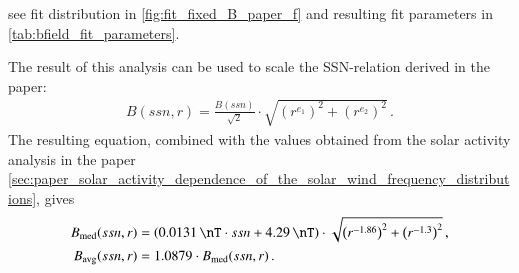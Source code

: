 see fit distribution in \autoref{fig:fit_fixed_B_paper_f} and resulting fit parameters in \autoref{tab:bfield_fit_parameters}.\\
\begin{figure}[htb]
\end{figure}


The result of this analysis can be used to scale the SSN-relation derived in the paper:
\begin{align}
	B(ssn,r) = \frac{B(ssn)}{\sqrt{2}} \cdot \sqrt{\left(r^{e_1}\right)^2 + \left(r^{e_2}\right)^2}	\,.
\end{align}
The resulting equation, combined with the values obtained from the solar activity analysis in the paper \autoref{sec:paper_solar_activity_dependence_of_the_solar_wind_frequency_distributions}, gives
\begin{align}
	B_\text{med}(ssn,r) &= \left(\SI{0.0131}{\nT} \cdot ssn + \SI{4.29}{\nT}\right) \cdot \sqrt{\left(r^{-1.86}\right)^2 + \left(r^{-1.3}\right)^2}	\,,\\
	B_\text{avg}(ssn,r) &= 1.0879 \cdot B_\text{med}(ssn,r)\,.
\end{align}

